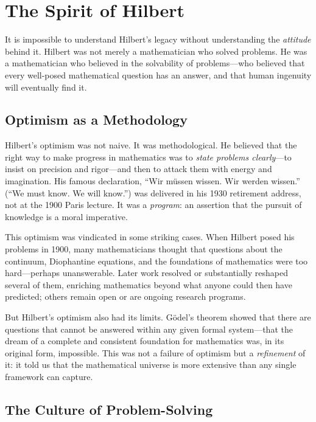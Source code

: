 \section{The Spirit of Hilbert}

It is impossible to understand Hilbert's legacy without understanding the \emph{attitude} behind it. Hilbert was not merely a mathematician who solved problems. He was a mathematician who believed in the solvability of problems---who believed that every well-posed mathematical question has an answer, and that human ingenuity will eventually find it.

\subsection{Optimism as a Methodology}

Hilbert's optimism was not naive. It was methodological. He believed that the right way to make progress in mathematics was to \emph{state problems clearly}---to insist on precision and rigor---and then to attack them with energy and imagination. His famous declaration, ``Wir m\"ussen wissen. Wir werden wissen.'' (``We must know. We will know.'') was delivered in his 1930 retirement address, not at the 1900 Paris lecture. It was a \emph{program}: an assertion that the pursuit of knowledge is a moral imperative.

This optimism was vindicated in some striking cases. When Hilbert posed his problems in 1900, many mathematicians thought that questions about the continuum, Diophantine equations, and the foundations of mathematics were too hard---perhaps unanswerable. Later work resolved or substantially reshaped several of them, enriching mathematics beyond what anyone could then have predicted; others remain open or are ongoing research programs.

But Hilbert's optimism also had its limits. G\"odel's theorem showed that there are questions that cannot be answered within any given formal system---that the dream of a complete and consistent foundation for mathematics was, in its original form, impossible. This was not a failure of optimism but a \emph{refinement} of it: it told us that the mathematical universe is more extensive than any single framework can capture.

\subsection{The Culture of Problem-Solving}

